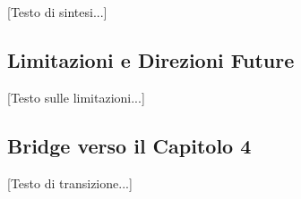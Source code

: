 [Testo di sintesi...]

\subsection{Limitazioni e Direzioni Future}

[Testo sulle limitazioni...]

\subsection{Bridge verso il Capitolo 4}

[Testo di transizione...]



%
%
%


% 
%
%
%
%
